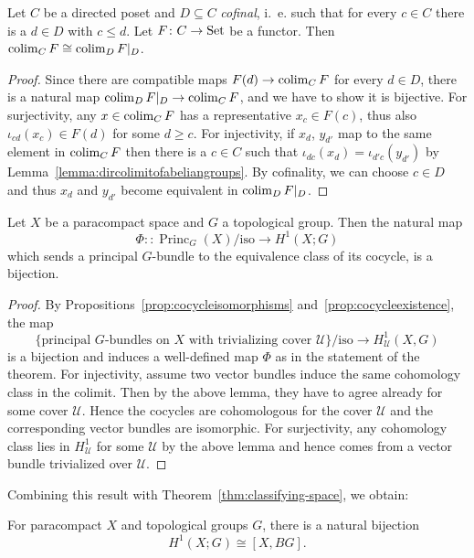 \documentclass[a4paper,openany]{scrbook}
\DeclareMathOperator{\Princ}{Princ}
\begin{document}
\begin{lemma}\label{lemma:cofinalcolimit}
Let $C$ be a directed poset and $D \subseteq C$ \emph{cofinal}, i.~e. such that for every $c \in C$ there is a $d \in D$ with $c \leq d$. Let $F\colon C \to \operatorname{Set}$ be a functor. Then $\operatorname*{colim}_C F \cong \operatorname*{colim}_D F|_D$.
\end{lemma}
\begin{proof}
Since there are compatible maps $F(d) \to \operatorname*{colim}_C F$ for every $d \in D$, there is a natural map $\operatorname*{colim}_D F|_D \to \operatorname*{colim}_C F$, and we have to show it is bijective. For surjectivity, any $x \in \operatorname*{colim}_C F$ has a representative $x_c \in F(c)$, thus also $\iota_{cd}(x_c) \in F(d)$ for some $d \geq c$. For injectivity, if $x_d$, $y_{d'}$ map to the same element in $\operatorname*{colim}_C F$ then there is a $c \in C$ such that $\iota_{dc}(x_d) = \iota_{d'c}(y_{d'})$ by Lemma~\ref{lemma:dircolimitofabeliangroups}. By cofinality, we can choose $c \in D$ and thus $x_d$ and $y_{d'}$ become equivalent in $\operatorname*{colim}_D F|_D$.
\end{proof}

\begin{thm}\label{thm:principalbundlesbycechcohomology}
Let $X$ be a paracompact space and $G$ a topological group. Then the natural map
\[
\Phi\colon\colon \Princ_G(X)/\text{iso} \to H^1(X;G)
\]
which sends a principal $G$-bundle to the equivalence class of its cocycle, is a bijection.
\end{thm}
\begin{proof}
By Propositions~\ref{prop:cocycleisomorphisms} and~\ref{prop:cocycleexistence}, the map
\[
\{\text{principal $G$-bundles on $X$ with trivializing cover $\mathcal U$}\}/\text{iso} \to H_\mathcal U^1(X,G)
\]
is a bijection and induces a well-defined map $\Phi$ as in the statement of the theorem. For injectivity, assume two vector bundles induce the same cohomology class in the colimit. Then by the above lemma, they have to agree already for some cover $\mathcal U$. Hence the cocycles are cohomologous for the cover $\mathcal U$ and the corresponding vector bundles are isomorphic. For surjectivity, any cohomology class lies in $H^1_{\mathcal U}$ for some $\mathcal U$ by the above lemma and hence comes from a vector bundle trivialized over $\mathcal U$.
\end{proof}

Combining this result with Theorem~\ref{thm:classifying-space}, we obtain:

\begin{corollary}\label{cor:H1representable}
For paracompact $X$ and topological groups $G$, there is a natural bijection
\[
H^1(X;G) \cong [X,BG].
\]
\end{corollary}
\end{document}
